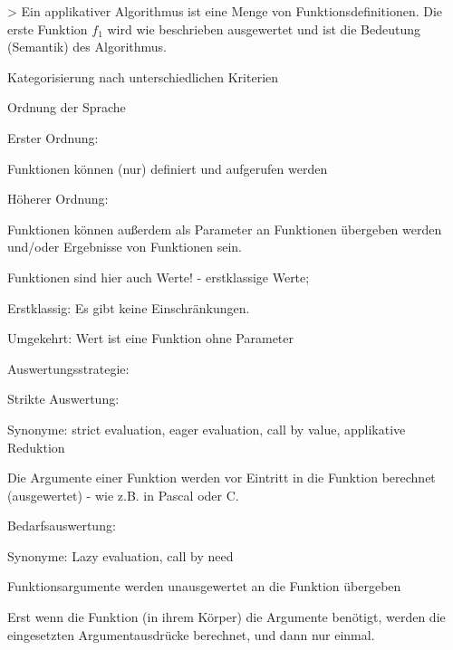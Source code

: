 \documentclass[10pt]{article}
\begin{document}
> Ein applikativer Algorithmus ist eine Menge von Funktionsdefinitionen. Die erste Funktion $f_1$ wird wie beschrieben ausgewertet und ist die Bedeutung (Semantik) des Algorithmus.

\begin{itemize*}
  \item Kategorisierung nach unterschiedlichen Kriterien
  \item Ordnung der Sprache
  \begin{itemize*}
    \item Erster Ordnung:
    \begin{itemize*}
      \item Funktionen können (nur) definiert und aufgerufen werden
    \end{itemize*}
    \item Höherer Ordnung:
    \begin{itemize*}
      \item Funktionen können außerdem als Parameter an Funktionen übergeben werden und/oder Ergebnisse von Funktionen sein.
      \item Funktionen sind hier auch Werte! - erstklassige Werte;
      \item Erstklassig: Es gibt keine Einschränkungen.
      \item Umgekehrt: Wert ist eine Funktion ohne Parameter
    \end{itemize*}
  \end{itemize*}
  \item Auswertungsstrategie:
  \begin{itemize*}
    \item Strikte Auswertung:
    \begin{itemize*}
      \item Synonyme: strict evaluation, eager evaluation, call by value, applikative Reduktion
      \item Die Argumente einer Funktion werden vor Eintritt in die Funktion berechnet (ausgewertet) - wie z.B. in Pascal oder C.
    \end{itemize*}
    \item Bedarfsauswertung:
    \begin{itemize*}
      \item Synonyme: Lazy evaluation, call by need
      \item Funktionsargumente werden unausgewertet an die Funktion übergeben
      \item Erst wenn die Funktion (in ihrem Körper) die Argumente benötigt, werden die eingesetzten Argumentausdrücke berechnet, und dann nur einmal.

\end{itemize*}
\end{itemize*}
\end{itemize*}
\end{document}
